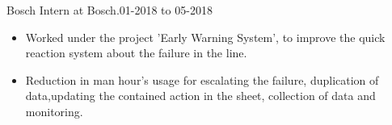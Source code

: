 \begin{experiences}
  \experience
    {Bosch}   {Intern at Bosch.01-2018 to 05-2018}{}{}
    {} {
                      \begin{itemize}
                        \item Worked under the project 'Early Warning System’, to improve the quick reaction system about the failure in the line.                       
                        \item Reduction in man hour’s usage for escalating the failure, duplication of data,updating the contained action in the sheet, collection of data and monitoring.
                        
                        
                        
                        
                      \end{itemize}
                    }


\end{experiences}
